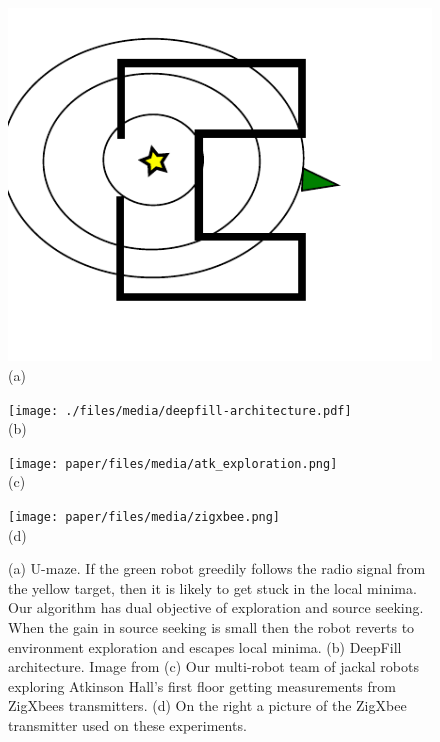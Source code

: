 \documentclass[sigconf]{aamas} %
\begin{document}
\begin{figure}
\parbox[][][b]{0.22\linewidth}{%
\centering \includegraphics[width=\linewidth]{./files/media/u-maze.pdf}\\(a)}
\parbox[][][b]{0.27\linewidth}{%
\centering \texttt{[image: ./files/media/deepfill-architecture.pdf]}\\(b)}
\parbox[][][b]{0.24\linewidth}{%
\centering \texttt{[image: paper/files/media/atk\_exploration.png]}\\(c)}
\parbox[][][b]{0.24\linewidth}{%
\centering \texttt{[image: paper/files/media/zigxbee.png]}\\(d)}
  \caption{
  (a) U-maze. If the green robot greedily follows the radio signal from the
  yellow target, then it is likely to get stuck in the local minima. Our
  algorithm has dual objective of exploration and source seeking. When the gain
  in source seeking is small then the robot reverts to environment exploration
  and escapes local minima.
  (b) DeepFill architecture. Image from \cite{yu2018DeepFill}
  (c) Our multi-robot team of jackal robots exploring Atkinson Hall's first floor getting measurements from ZigXbees transmitters. 
  (d) On the right a picture of the ZigXbee transmitter used on these experiments.}%
  \label{fig:exp:expl_atk}%
  \label{fig:deepfill}%
  \label{fig:c-maze}
\end{figure}


\end{document}
